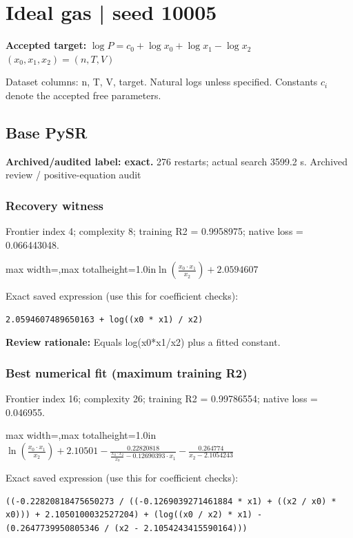 \documentclass[10pt,letterpaper,landscape]{article}
\begin{document}
\section*{Ideal gas | seed 10005}
\textbf{Accepted target:} $\displaystyle \log P=c_0+\log x_0+\log x_1-\log x_2$\hfill $(x_0,x_1,x_2)=(n,T,V)$\par
{\small Dataset columns: n, T, V, target. Natural logs unless specified. Constants $c_i$ denote the accepted free parameters.}\par\medskip
\begin{minipage}[t]{0.485\textwidth}
\subsection*{Base PySR}
\textbf{Archived/audited label: exact.} 276 restarts; actual search 3599.2 s.
{\small Archived review / positive-equation audit}
\subsubsection*{Recovery witness}
Frontier index 4; complexity 8; training R2 = 0.9958975; native loss = 0.066443048.
\begin{center}\begin{adjustbox}{max width=\linewidth,max totalheight=1.0in}$\displaystyle \ln{\left(\frac{x_{0} \cdot x_{1}}{x_{2}} \right)} + 2.0594607$\end{adjustbox}\end{center}
{\scriptsize Exact saved expression (use this for coefficient checks):}
\begin{lstlisting}
2.0594607489650163 + log((x0 * x1) / x2)
\end{lstlisting}
{\small\textbf{Review rationale:} Equals log(x0*x1/x2) plus a fitted constant.}
\subsubsection*{Best numerical fit (maximum training R2)}
Frontier index 16; complexity 26; training R2 = 0.99786554; native loss = 0.046955.
\begin{center}\begin{adjustbox}{max width=\linewidth,max totalheight=1.0in}$\displaystyle \ln{\left(\frac{x_{0} \cdot x_{1}}{x_{2}} \right)} + 2.10501 - \frac{0.22820818}{\frac{x_{0} \cdot x_{2}}{x_{0}} - 0.12690393 \cdot x_{1}} - \frac{0.264774}{x_{2} - 2.1054243}$\end{adjustbox}\end{center}
{\scriptsize Exact saved expression (use this for coefficient checks):}
\begin{lstlisting}
((-0.22820818475650273 / ((-0.1269039271461884 * x1) + ((x2 / x0) * x0))) + 2.1050100032527204) + (log((x0 / x2) * x1) - (0.2647739950805346 / (x2 - 2.1054243415590164)))
\end{lstlisting}
\end{minipage}\hfill
\end{document}

